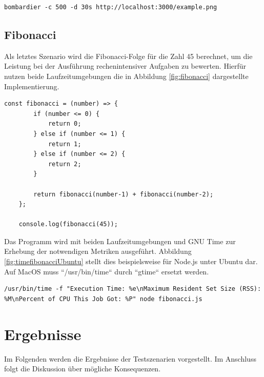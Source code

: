 \begin{lstlisting}[caption={Bombardier File-Server},label={fig:bombardierFileServer}]
	bombardier -c 500 -d 30s http://localhost:3000/example.png
\end{lstlisting}

\subsection{Fibonacci} \label{subsec:fibonacci}
Als letztes Szenario wird die Fibonacci-Folge für die Zahl 45 berechnet, um die Leistung bei der Ausführung rechenintensiver Aufgaben zu bewerten. Hierfür nutzen beide Laufzeitumgebungen die in Abbildung \ref{fig:fibonacci} dargestellte Implementierung.

\begin{lstlisting}[caption={Berechnung der Fibonacci-Folge},label={fig:fibonacci}]
	const fibonacci = (number) => {
		if (number <= 0) {
			return 0;
		} else if (number <= 1) {
			return 1;
		} else if (number <= 2) {
			return 2;
		}
		
		return fibonacci(number-1) + fibonacci(number-2);
	};
	
	console.log(fibonacci(45));
\end{lstlisting}

\noindent
Das Programm wird mit beiden Laufzeitumgebungen und GNU Time zur Erhebung der notwendigen Metriken ausgeführt. Abbildung \ref{fig:timefibonacciUbuntu} stellt dies beispielsweise für Node.js unter Ubuntu dar. Auf MacOS muss ``/usr/bin/time`` durch ``gtime`` ersetzt werden.
\begin{lstlisting}[caption={Fibonacci Node.js},label={fig:timefibonacciUbuntu}]
	/usr/bin/time -f "Execution Time: %e\nMaximum Resident Set Size (RSS): %M\nPercent of CPU This Job Got: %P" node fibonacci.js
\end{lstlisting}



\section{Ergebnisse} \label{sec:performance-results}
Im Folgenden werden die Ergebnisse der Testszenarien vorgestellt. Im Anschluss folgt die Diskussion über mögliche Konsequenzen.\\


